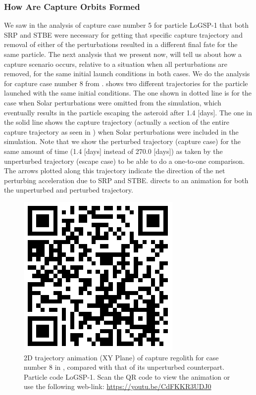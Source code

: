 \subsubsection{How Are Capture Orbits Formed}
We saw in the analysis of capture case number 5 for particle LoGSP-1 that both \gls{SRP} and \gls{STBE} were necessary for getting that specific capture trajectory and removal of either of the perturbations resulted in a different final fate for the same particle. The next analysis that we present now, will tell us about how a capture scenario occurs, relative to a situation when all perturbations are removed, for the same initial launch conditions in both cases. We do the analysis for capture case number 8 from .  shows two different trajectories for the particle launched with the same initial conditions. The one shown in dotted line is for the case when Solar perturbations were omitted from the simulation, which eventually results in the particle escaping the asteroid after 1.4 [days]. The one in the solid line shows the capture trajectory (actually a section of the entire capture trajectory as seen in ) when Solar perturbations were included in the simulation. Note that we show the perturbed trajectory (capture case) for the same amount of time (1.4 [days] instead of 270.0 [days]) as taken by the unperturbed trajectory (escape case) to be able to do a one-to-one comparison. The arrows plotted along this trajectory indicate the direction of the net perturbing acceleration due to \gls{SRP} and \gls{STBE}.  directs to an animation for both the unperturbed and perturbed trajectory.
\begin{figure}[htb]
\centering
\captionsetup{justification=centering}
\includegraphics[scale=0.25]{longest_edge_perturbations/3.2Density_1cmSize/qrcode_comparative_8ms_165Azimuth_45SolarPhase.png}
\caption{2D trajectory animation (XY Plane) of capture regolith for case number 8 in , compared with that of its unperturbed counterpart. Particle code LoGSP-1. Scan the QR code to view the animation or use the following web-link: \url{https://youtu.be/CdFKKR3UDJ0}}
\label{fig:LoGSP_1_capture_case_8_2d_trajectory_comparative_animation}
\end{figure}
